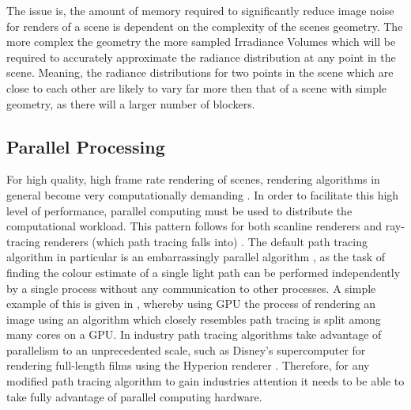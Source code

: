 \documentclass[../dissertation.tex]{subfiles}
\begin{document}
The issue is, the amount of memory required to significantly reduce image noise for renders of a scene is dependent on the complexity of the scenes geometry. The more complex the geometry the more sampled Irradiance Volumes which will be required to accurately approximate the radiance distribution at any point in the scene. Meaning, the radiance distributions for two points in the scene which are close to each other are likely to vary far more then that of a scene with simple geometry, as there will a larger number of blockers. %


\subsection{Parallel Processing}

For high quality, high frame rate rendering of scenes, rendering algorithms in general become very computationally demanding \cite{crockett1995parallel}. In order to facilitate this high level of performance, parallel computing must be used to distribute the computational workload. This pattern follows for both scanline renderers and ray-tracing renderers (which path tracing falls into) \cite{alerstam2008parallel, fatahalian2009data}. The default path tracing algorithm in particular is an embarrassingly parallel algorithm \cite{embarissingly_parallelizable}, as the task of finding the colour estimate of a single light path can be performed independently by a single process without any communication to other processes. A simple example of this is given in \cite{accelerated_ray_tracing}, whereby using GPU the process of rendering an image using an algorithm which closely resembles path tracing is split among many cores on a GPU. In industry path tracing algorithms take advantage of parallelism to an unprecedented scale, such as Disney's supercomputer for rendering full-length films using the Hyperion renderer \cite{hyperion}. Therefore, for any modified path tracing algorithm to gain industries attention it needs to be able to take fully advantage of parallel computing hardware.\\
\end{document}
